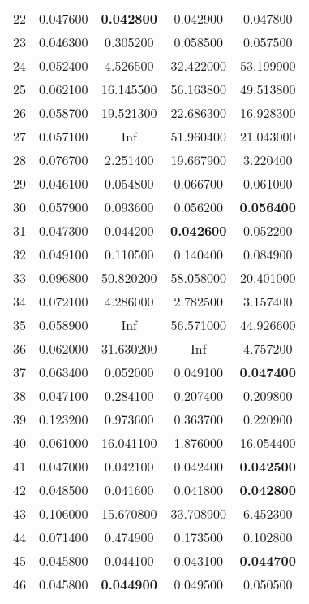 \begin{longtable}{c|c|ccc}
22  &   0.047600  &   \textbf{0.042800}  &   0.042900   &   0.047800  \\
23  &   0.046300  &   0.305200  &   0.058500   &   0.057500  \\
24  &   0.052400  &   4.526500  &  32.422000   &  53.199900  \\
25  &   0.062100  &  16.145500  &  56.163800   &  49.513800  \\
26  &   0.058700  &  19.521300  &  22.686300   &  16.928300  \\
27  &   0.057100  &        Inf  &  51.960400   &  21.043000  \\
28  &   0.076700  &   2.251400  &  19.667900   &   3.220400  \\
29  &   0.046100  &   0.054800  &   0.066700   &   0.061000  \\
30  &   0.057900  &   0.093600  &   0.056200   &   \textbf{0.056400}  \\\hline
31  &   0.047300  &   0.044200  &   \textbf{0.042600}   &   0.052200  \\
32  &   0.049100  &   0.110500  &   0.140400   &   0.084900  \\
33  &   0.096800  &  50.820200  &  58.058000   &  20.401000  \\
34  &   0.072100  &   4.286000  &   2.782500   &   3.157400  \\
35  &   0.058900  &        Inf  &  56.571000   &  44.926600  \\
36  &   0.062000  &  31.630200  &        Inf   &   4.757200  \\
37  &   0.063400  &   0.052000  &   0.049100   &   \textbf{0.047400}  \\
38  &   0.047100  &   0.284100  &   0.207400   &   0.209800  \\
39  &   0.123200  &   0.973600  &   0.363700   &   0.220900  \\
40  &   0.061000  &  16.041100  &   1.876000   &  16.054400  \\ \hline
41  &   0.047000  &   0.042100  &   0.042400   &   \textbf{0.042500}  \\
42  &   0.048500  &   0.041600  &   0.041800   &   \textbf{0.042800}  \\
43  &   0.106000  &  15.670800  &  33.708900   &   6.452300  \\
44  &   0.071400  &   0.474900  &   0.173500   &   0.102800  \\
45  &   0.045800  &   0.044100  &   0.043100   &   \textbf{0.044700}  \\
46  &   0.045800  &   \textbf{0.044900}  &   0.049500   &   0.050500  \\

\end{longtable}
